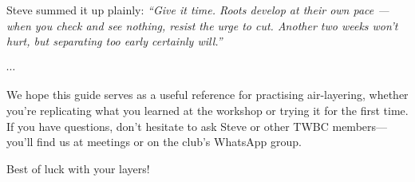 Steve summed it up plainly: \textit{``Give it time. Roots develop at their own pace --- when you check and see nothing, resist the urge to cut. Another two weeks won't hurt, but separating too early certainly will.''}

\begin{center}
    $\cdots$
\end{center}

\noindent
We hope this guide serves as a useful reference for practising air\--layering, whether you're replicating what you learned at the workshop or trying it for the first time. If you have questions, don't hesitate to ask Steve or other TWBC members---you'll find us at meetings or on the club's WhatsApp group.

Best of luck with your layers!

\closearticle
\columnbreak
